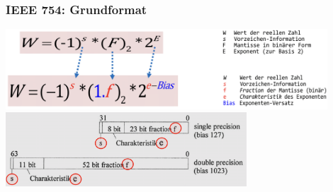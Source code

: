 \subsubsection{IEEE 754: Grundformat}
	\includegraphics[width=12cm]{pics/IEEE-Grundformat_Darstellung}\\
	\includegraphics[width=9cm]{pics/IEEE-Grundformat}\\

